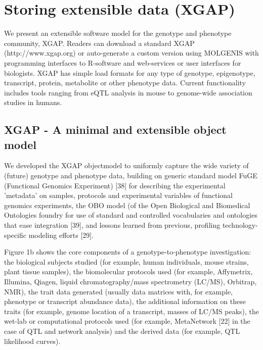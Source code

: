 \section{Storing extensible data (XGAP)}
We present an extensible software model for the genotype and phenotype community, XGAP. Readers 
can download a standard XGAP (http://www.xgap.org) or auto-generate a custom version using 
MOLGENIS with programming interfaces to R-software and web-services or user interfaces for 
biologists. XGAP has simple load formats for any type of genotype, epigenotype, transcript, 
protein, metabolite or other phenotype data. Current functionality includes tools ranging 
from eQTL analysis in mouse to genome-wide association studies in humans.

\subsection{XGAP - A minimal and extensible object model}
We developed the XGAP objectmodel to uniformly capture the wide variety of (future) genotype 
and phenotype data, building on generic standard model FuGE (Functional Genomics Experiment) 
[38] for describing the experimental 'metadata' on samples, protocols and experimental variables 
of functional genomics experiments, the OBO model (of the Open Biological and Biomedical 
Ontologies foundry for use of standard and controlled vocabularies and ontologies that ease 
integration [39], and lessons learned from previous, profiling technology-specific modeling efforts [29].

Figure 1b shows the core components of a genotype-to-phenotype investigation: the biological 
subjects studied (for example, human individuals, mouse strains, plant tissue samples), the 
biomolecular protocols used (for example, Affymetrix, Illumina, Qiagen, liquid 
chromatography/mass spectrometry (LC/MS), Orbitrap, NMR), the trait data generated (usually 
data matrices with, for example, phenotype or transcript abundance data), the additional 
information on these traits (for example, genome location of a transcript, masses of LC/MS peaks), 
the wet-lab or computational protocols used (for example, MetaNetwork [22] in the case of QTL and
network analysis) and the derived data (for example, QTL likelihood curves).


